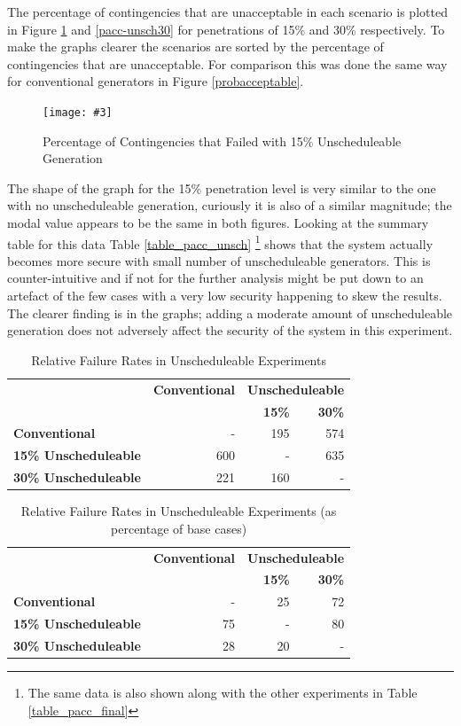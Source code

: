 \documentclass[a4paper,oneside,12pt]{report}
\newcommand{\image}[3] {
  \begin{figure}
    \begin{center}
      \texttt{[image: \#3]}
      \caption{#2}
      \label{#1}
    \end{center}
  \end{figure}
}
\begin{document}
The percentage of contingencies that are unacceptable in each scenario is plotted in Figure \ref{pacc-unsch15} and \ref{pacc-unsch30} for penetrations of 15\% and 30\% respectively. To make the graphs clearer the scenarios are sorted by the percentage of contingencies that are unacceptable. For comparison this was done the same way for conventional generators in Figure \ref{probacceptable}.

\image{pacc-unsch15}{Percentage of Contingencies that Failed with 15\% Unscheduleable Generation}{pacc-unsch15.png}

The shape of the graph for the 15\% penetration level is very similar to the one with no unscheduleable generation, curiously it is also of a similar magnitude; the modal value appears to be the same in both figures. Looking at the summary table for this data Table \ref{table_pacc_unsch} \footnote{The same data is also shown along with the other experiments in Table \ref{table_pacc_final}} shows that the system actually becomes more secure with small number of unscheduleable generators. This is counter-intuitive and if not for the further analysis might be put down to an artefact of the few cases with a very low security happening to skew the results. The clearer finding is in the graphs; adding a moderate amount of unscheduleable generation does not adversely affect the security of the system in this experiment.

\begin{table}[htbp]
\caption{Relative Failure Rates in Unscheduleable Experiments}
\begin{tabular}{l|r|r|r}
\bfseries & \bfseries Conventional & \multicolumn{2}{c}{ \bfseries Unscheduleable} \\
\bfseries & \bfseries & \bfseries 15\% & \bfseries 30\% \\
\hline \hline
\bfseries Conventional & - & 195 & 574 \\ 
\bfseries 15\% Unscheduleable & 600 & - & 635  \\
\bfseries 30\% Unscheduleable & 221 & 160 & -  \\ 
\hline
\end{tabular}
\label{table_relative_failure_unsch}
\end{table}

\begin{table}[htbp]
\caption{Relative Failure Rates in Unscheduleable Experiments (as percentage of base cases)}
\begin{tabular}{l|r|r|r}
\bfseries & \bfseries Conventional & \multicolumn{2}{c}{ \bfseries Unscheduleable} \\
\bfseries & \bfseries & \bfseries 15\% & \bfseries 30\% \\
\hline \hline
\bfseries Conventional        &  - & 25 & 72 \\
\bfseries 15\% Unscheduleable & 75 &  - & 80 \\
\bfseries 30\% Unscheduleable & 28 & 20 &  - \\
\hline
\end{tabular}
\label{table_relative_failure_percent_unsch}
\end{table}
\end{document}

